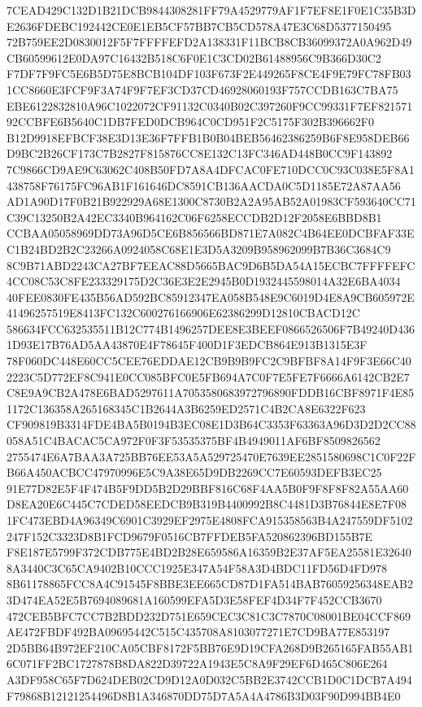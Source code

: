 \documentclass[UTF8,fontset=fandol,zihao=-4,a4paper]{ctexart}
\begin{document}
{{7CEAD429C132D1B21DCB9844308281FF79A4529779AF1F7EF8E1F0E1C35B3DE2636FDEBC192442CE0E1EB5CF57BB7CB5CD578A47E3C68D5377150495
72B759EE2D0830012F5F7FFFFEFD2A138331F11BCB8CB36099372A0A962D49CB60599612E0DA97C16432B518C6F0E1C3CD02B61488956C9B366D30C2
F7DF7F9FC5E6B5D75E8BCB104DF103F673F2E449265F8CE4F9E79FC78FB031CC8660E3FCF9F3A74F9F7EF3CD37CD46928060193F757CCDB163C7BA75
EBE6122832810A96C1022072CF91132C0340B02C397260F9CC99331F7EF82157192CCBFE6B5640C1DB7FED0DCB964C0CD951F2C5175F302B396662F0
B12D9918EFBCF38E3D13E36F7FFB1B0B04BEB56462386259B6F8E958DEB66D9BC2B26CF173C7B2827F815876CC8E132C13FC346AD448B0CC9F143892
7C9866CD9AE9C63062C408B50FD7A8A4DFCAC0FE710DCC0C93C038E5F8A1438758F76175FC96AB1F161646DC8591CB136AACDA0C5D1185E72A87AA56
AD1A90D17F0B21B922929A68E1300C8730B2A2A95AB52A01983CF593640CC71C39C13250B2A42EC3340B964162C06F6258ECCDB2D12F2058E6BBD8B1
CCBAA05058969DD73A96D5CE6B856566BD871E7A082C4B64EE0DCBFAF33EC1B24BD2B2C23266A0924058C68E1E3D5A3209B958962099B7B36C3684C9
8C9B71ABD2243CA27BF7EEAC88D5665BAC9D6B5DA54A15ECBC7FFFFEFC4CC08C53C8FE233329175D2C36E3E2E2945B0D1932445598014A32E6BA4034
40FEE0830FE435B56AD592BC85912347EA058B548E9C6019D4E8A9CB605972E41496257519E8413FC132C600276166906E62386299D12810CBACD12C
586634FCC632535511B12C774B1496257DEE8E3BEEF0866526506F7B49240D4361D93E17B76AD5AA43870E4F78645F400D1F3EDCB864E913B1315E3F
78F060DC448E60CC5CEE76EDDAE12CB9B9B9FC2C9BFBF8A14F9F3E66C402223C5D772EF8C941E0CC085BFC0E5FB694A7C0F7E5FE7F6666A6142CB2E7
C8E9A9CB2A478E6BAD5297611A7053580683972796890FDDB16CBF8971F4E851172C136358A265168345C1B2644A3B6259ED2571C4B2CA8E6322F623
CF909819B3314FDE4BA5B0194B3EC08E1D3B64C3353F63363A96D3D2D2CC88058A51C4BACAC5CA972F0F3F53535375BF4B4949011AF6BF8509826562
2755474E6A7BAA3A725BB76EE53A5A529725470E7639EE2851580698C1C0F22FB66A450ACBCC47970996E5C9A38E65D9DB2269CC7E60593DEFB3EC25
91E77D82E5F4F474B5F9DD5B2D29BBF816C68F4AA5B0F9F8F8F82A55AA60D8EA20E6C445C7CDED58EEDCB9B319B4400992B8C4481D3B76844E8E7F08
1FC473EBD4A96349C6901C3929EF2975E4808FCA915358563B4A247559DF5102247F152C3323D8B1FCD9679F0516CB7FFDEB5FA520862396BD155B7E
F8E187E5799F372CDB775E4BD2B28E659586A16359B2E37AF5EA25581E326408A3440C3C65CA9402B10CCC1925E347A54F58A3D4BDC11FD56D4FD978
8B61178865FCC8A4C91545F8BBE3EE665CD87D1FA514BAB76059256348EAB23D474EA52E5B7694089681A160599EFA5D3E58FEF4D34F7F452CCB3670
472CEB5BFC7CC7B2BDD232D751E659CEC3C81C3C7870C08001BE04CCF869AE472FBDF492BA09695442C515C435708A8103077271E7CD9BA77E853197
2D5BB64B972EF210CA05CBF8172F5BB76E9D19CFA268D9B265165FAB55AB16C071FF2BC1727878B8DA822D39722A1943E5C8A9F29EF6D465C806E264
A3DF958C65F7D624DEB02CD9D12A0D032C5BB2E3742CCB1D0C1DCB7A494F79868B12121254496D8B1A346870DD75D7A5A4A4786B3D03F90D994BB4E0
}}
\end{document}
